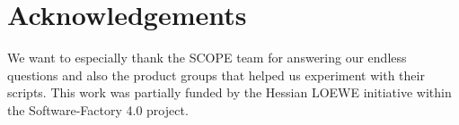 \documentclass[sigconf]{acmart}
\begin{document}


\maketitle











\section*{Acknowledgements}
We want to especially thank the SCOPE team for answering our endless questions and also the product groups that helped us experiment with their scripts. This work was partially funded by the Hessian LOEWE initiative within the Software-Factory 4.0 project.


 
\end{document}
